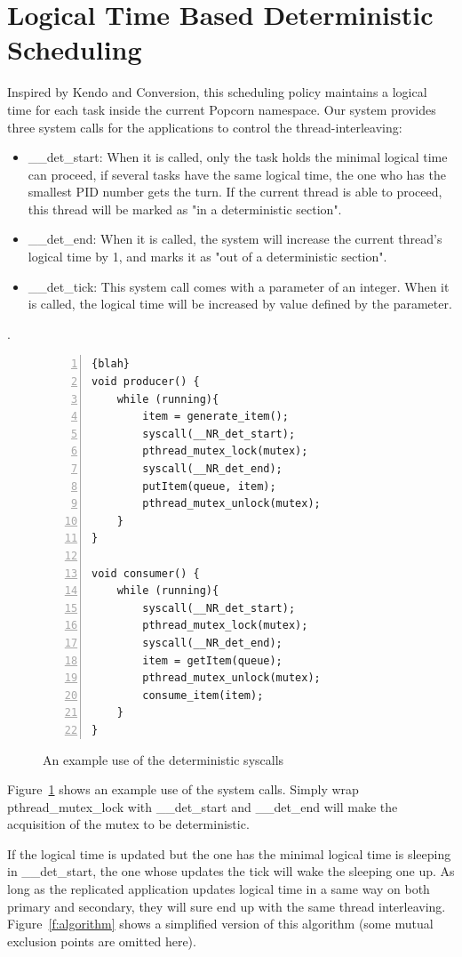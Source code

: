 \section{Logical Time Based Deterministic Scheduling} \label{sec:detsched}
Inspired by Kendo and Conversion, this scheduling policy maintains a logical time for each task inside the current Popcorn namespace. Our system provides three system calls for the applications to control the thread-interleaving:
\begin{itemize}
   \item \_\_det\_start: When it is called, only the task holds the minimal logical time can proceed, if several tasks have the same logical time, the one who has the smallest PID number gets the turn. If the current thread is able to proceed, this thread will be marked as "in a deterministic section".
   \item \_\_det\_end: When it is called, the system will increase the current thread's logical time by 1, and marks it as "out of a deterministic section".
   \item \_\_det\_tick: This system call comes with a parameter of an integer. When it is called, the logical time will be increased by value defined by the parameter.
\end{itemize}.

\begin{figure}
\centering
\begin{lstlisting}[numbers=left, frame=single, basicstyle=\small, breaklines]{blah}
void producer() {
    while (running){
        item = generate_item();
	    syscall(__NR_det_start);
	    pthread_mutex_lock(mutex);
	    syscall(__NR_det_end);    
	    putItem(queue, item);    
	    pthread_mutex_unlock(mutex);
    }
}

void consumer() {
    while (running){
        syscall(__NR_det_start);
        pthread_mutex_lock(mutex);
        syscall(__NR_det_end);
        item = getItem(queue);    
        pthread_mutex_unlock(mutex);		
        consume_item(item);
    }
}
\end{lstlisting}
\caption{An example use of the deterministic syscalls}
\label{fig:example}
\end{figure}
Figure~\ref{fig:example} shows an example use of the system calls. Simply wrap pthread\_mutex\_lock with \_\_det\_start and \_\_det\_end will make the acquisition of the mutex to be deterministic.

If the logical time is updated but the one has the minimal logical time is sleeping in \_\_det\_start, the one whose updates the tick will wake the sleeping one up. As long as the replicated application updates logical time in a same way on both primary and secondary, they will sure end up with the same thread interleaving. Figure~\ref{f:algorithm} shows a simplified version of this algorithm (some mutual exclusion points are omitted here).

